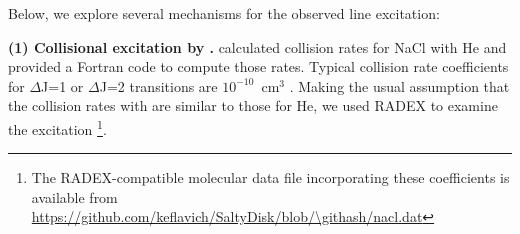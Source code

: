 \documentclass[twocolumn]{aastex62}
\newcommand{\rlp}[1]{\textcolor{red!65!black}{\textbf{[RLP: #1]}}}
\newcommand{\ag}[1]{\textcolor{red!65!black}{\textbf{[AG: #1]}}}
\begin{document}

Below, we explore several mechanisms for the observed line excitation:

\par{\textbf{(1) Collisional excitation by \hh.}} 
%
%
\citet{Quintana-Lacaci2016a} calculated collision rates for NaCl with He and
provided a Fortran code to compute those rates.  Typical collision rate
coefficients for \hbox{$\Delta$J=1} or \hbox{$\Delta$J=2} transitions are
$10^{-10}$~cm$^3$ \pers.  Making the usual assumption that the collision rates
with \hh are similar to those for He, we used RADEX \citep{van-der-Tak2007a} to
examine the excitation \footnote{The RADEX-compatible molecular data file
incorporating these coefficients is available from
\url{https://github.com/keflavich/SaltyDisk/blob/\githash/nacl.dat}}.
\end{document}
